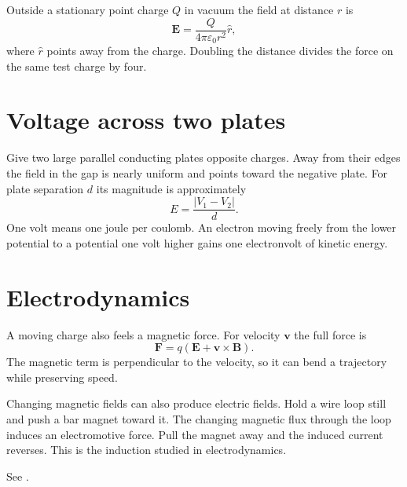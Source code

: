 Outside a stationary point charge $Q$ in
vacuum the field at distance $r$ is
$$
\mathbf E=
\frac{Q}{4\pi\varepsilon_0 r^2}\hat r,
$$
where $\hat r$ points away from the charge.
Doubling the distance divides the force on
the same test charge by four.

\section{Voltage across two plates}
Give two large parallel conducting plates
opposite charges. Away from their edges the
field in the gap is nearly uniform and points
toward the negative plate. For plate
separation $d$ its magnitude is approximately
$$
E=\frac{|V_1-V_2|}{d}.
$$
One volt means one joule per coulomb. An
electron moving freely from the lower
potential to a potential one volt higher
gains one electronvolt of kinetic energy.

\section{Electrodynamics}
A moving charge also feels a magnetic force.
For velocity $\mathbf v$ the full force is
$$
\mathbf F=q(\mathbf E+
\mathbf v\times\mathbf B).
$$
The magnetic term is perpendicular to the
velocity, so it can bend a trajectory while
preserving speed.

Changing magnetic fields can also produce
electric fields. Hold a wire loop still and
push a bar magnet toward it. The changing
magnetic flux through the loop induces an
electromotive force. Pull the magnet away and
the induced current reverses. This is the
induction studied in electrodynamics.

See \cite[Vol. II, Sections 1-1 to 1-4 and
17-1]{feynman-lectures}.





